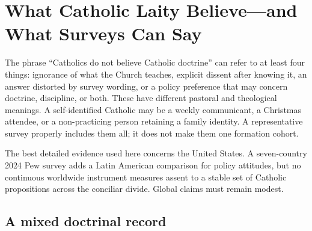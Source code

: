\section{What Catholic Laity Believe—and What Surveys Can Say}

The phrase “Catholics do not believe Catholic doctrine” can refer to at least four things: ignorance of what the Church teaches, explicit dissent after knowing it, an answer distorted by survey wording, or a policy preference that may concern doctrine, discipline, or both. These have different pastoral and theological meanings. A self-identified Catholic may be a weekly communicant, a Christmas attendee, or a non-practicing person retaining a family identity. A representative survey properly includes them all; it does not make them one formation cohort.

The best detailed evidence used here concerns the United States. A seven-country 2024 Pew survey adds a Latin American comparison for policy attitudes, but no continuous worldwide instrument measures assent to a stable set of Catholic propositions across the conciliar divide. Global claims must remain modest.

\subsection{A mixed doctrinal record}

